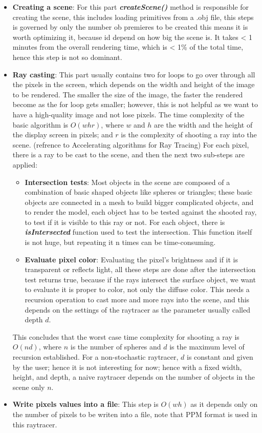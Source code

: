 \documentclass[11pt,a4paper]{article}
\begin{document}
 	\begin{itemize}
 		\item \textbf{Creating a scene}: For this part \textbf{\textit{createScene()}} method is responsible for creating the scene, this includes loading primitives from a .obj file, this steps is governed by only the number ob premieres to be created this means it is worth optimizing it, because id depend on how big the scene is.   It takes < 1 minutes from the overall rendering time, which is < 1\% of the total time, hence this step is not so dominant.
 		\item  \textbf{Ray casting}: This part usually contains two for loops to go over through all the pixels in the screen, which depends on the width and height of the image to be rendered. The smaller the size of the image, the faster the rendered become as the for loop gets smaller; however, this is not helpful as we want to have a high-quality image and not lose pixels.
 		The time complexity of the basic algorithm is $ O(w hr) $, where $ w $ and $ h $ are the width and the height of the display screen in pixels; and $ r $ is the complexity of shooting a ray into the scene. (refrence to Accelerating algorithms for Ray Tracing)
 		 For each pixel, there is a ray to be cast to the scene, and then the next two sub-steps are applied: 
 			\begin{itemize}
 			 \item \textbf{Intersection tests}: Most objects in the scene are composed of a combination of basic shaped objects like spheres or triangles; these basic objects are connected in a mesh to build bigger complicated objects, and to render the model, each object has to be tested against the shooted ray, to test if it is visible to this ray or not. For each object, there is \textbf{\textit{isIntersected}} function used to test the intersection. This function itself is not huge, but repeating it n times can be time-consuming.
 			\item  \textbf{Evaluate pixel color}: Evaluating the pixel's brightness and if it is transparent or reflects light, all these steps are done after the intersection test returns true, because if the rays intersect the surface object, we want to evaluate it is proper to color, not only the diffuse color. This needs a recursion operation to cast more and more rays into the scene, and this depends on the settings of the raytracer as the parameter usually called depth $ d $.
 			\end{itemize}
 		
 		This concludes that the worst case time complexity for shooting a ray is $ O(nd) $, where $ n $ is the number of spheres and $ d $ is the maximum level of recursion established.
 		For a non-stochastic raytracer, $ d $ is constant and given by the user; hence it is not interesting for now; hence with a fixed width, height, and depth, a naive raytracer depends on the number of objects in the scene only $ n $. 
 		\item \textbf{Write pixels values into a file}: This step is $ O(wh) $ as it depends only on the number of pixels to be writen into a file, note that PPM format is used in this raytracer.
 		 	\end{itemize}
\end{document}
